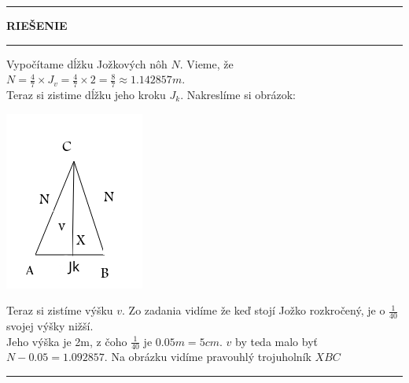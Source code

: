 \documentclass{article}
\begin{document}
\hrule
\medskip
\begin{center}
\textbf{\huge RIEŠENIE}
\end{center}
\medskip
\hrule
\medskip
\large
Vypočítame dĺžku Jožkových nôh $N$.
Vieme, že $N = \frac{4}{7} \times J_v = \frac{4}{7} \times 2 = \frac{8}{7} \approx 1.142857 m  $.\\
Teraz si zistime dĺžku jeho kroku $J_k$.
Nakreslíme si obrázok:
\medskip
\begin{center}
	\includegraphics{imagex/trojuholnik.png}
\end{center}

\noindent Teraz si zistíme výšku $v$. Zo zadania vidíme že keď stojí Jožko rozkročený, je o $\frac{1}{40}$ svojej výšky nižší.\\
Jeho výška je 2m, z čoho $\frac{1}{40}$ je $0.05m = 5cm$.
$v$ by teda malo byť $N - 0.05 = 1.092857$.
Na obrázku vidíme pravouhlý trojuholník $XBC$
\medskip
\hrule
\end{document}
